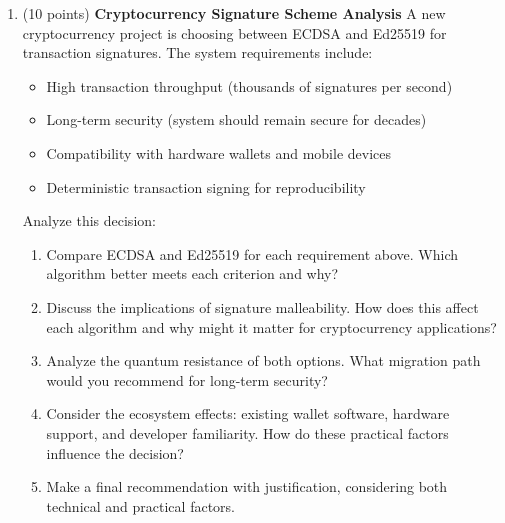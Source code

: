 \documentclass[10pt,a4paper,american]{article}
\begin{document}
\begin{enumerate}
	\item (10 points) \textbf{Cryptocurrency Signature Scheme Analysis}
	      A new cryptocurrency project is choosing between ECDSA and Ed25519 for transaction signatures. The system requirements include:
	      \begin{itemize}
		      \item High transaction throughput (thousands of signatures per second)
		      \item Long-term security (system should remain secure for decades)
		      \item Compatibility with hardware wallets and mobile devices
		      \item Deterministic transaction signing for reproducibility
	      \end{itemize}
	      Analyze this decision:
	      \begin{enumerate}
		      \item Compare ECDSA and Ed25519 for each requirement above. Which algorithm better meets each criterion and why?
		      \item Discuss the implications of signature malleability. How does this affect each algorithm and why might it matter for cryptocurrency applications?
		      \item Analyze the quantum resistance of both options. What migration path would you recommend for long-term security?
		      \item Consider the ecosystem effects: existing wallet software, hardware support, and developer familiarity. How do these practical factors influence the decision?
		      \item Make a final recommendation with justification, considering both technical and practical factors.
	      \end{enumerate}


\end{enumerate}
\end{document}
